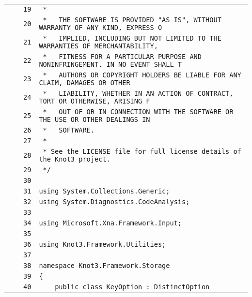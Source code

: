 \documentclass[a4paper,10pt]{article}
\begin{document}
\begin{longtable}[l]{lrrl}
\cellcolor{gray} &  & \verb~19~ & \verb~ *~\\
\cellcolor{gray} &  & \verb~20~ & \verb~ *   THE SOFTWARE IS PROVIDED "AS IS", WITHOUT WARRANTY OF ANY KIND, EXPRESS O~\\
\cellcolor{gray} &  & \verb~21~ & \verb~ *   IMPLIED, INCLUDING BUT NOT LIMITED TO THE WARRANTIES OF MERCHANTABILITY,~\\
\cellcolor{gray} &  & \verb~22~ & \verb~ *   FITNESS FOR A PARTICULAR PURPOSE AND NONINFRINGEMENT. IN NO EVENT SHALL T~\\
\cellcolor{gray} &  & \verb~23~ & \verb~ *   AUTHORS OR COPYRIGHT HOLDERS BE LIABLE FOR ANY CLAIM, DAMAGES OR OTHER~\\
\cellcolor{gray} &  & \verb~24~ & \verb~ *   LIABILITY, WHETHER IN AN ACTION OF CONTRACT, TORT OR OTHERWISE, ARISING F~\\
\cellcolor{gray} &  & \verb~25~ & \verb~ *   OUT OF OR IN CONNECTION WITH THE SOFTWARE OR THE USE OR OTHER DEALINGS IN~\\
\cellcolor{gray} &  & \verb~26~ & \verb~ *   SOFTWARE.~\\
\cellcolor{gray} &  & \verb~27~ & \verb~ *~\\
\cellcolor{gray} &  & \verb~28~ & \verb~ * See the LICENSE file for full license details of the Knot3 project.~\\
\cellcolor{gray} &  & \verb~29~ & \verb~ */~\\
\cellcolor{gray} &  & \verb~30~ & \verb~~\\
\cellcolor{gray} &  & \verb~31~ & \verb~using System.Collections.Generic;~\\
\cellcolor{gray} &  & \verb~32~ & \verb~using System.Diagnostics.CodeAnalysis;~\\
\cellcolor{gray} &  & \verb~33~ & \verb~~\\
\cellcolor{gray} &  & \verb~34~ & \verb~using Microsoft.Xna.Framework.Input;~\\
\cellcolor{gray} &  & \verb~35~ & \verb~~\\
\cellcolor{gray} &  & \verb~36~ & \verb~using Knot3.Framework.Utilities;~\\
\cellcolor{gray} &  & \verb~37~ & \verb~~\\
\cellcolor{gray} &  & \verb~38~ & \verb~namespace Knot3.Framework.Storage~\\
\cellcolor{gray} &  & \verb~39~ & \verb~{~\\
\cellcolor{gray} &  & \verb~40~ & \verb~    public class KeyOption : DistinctOption~\\

\end{longtable}
\end{document}
